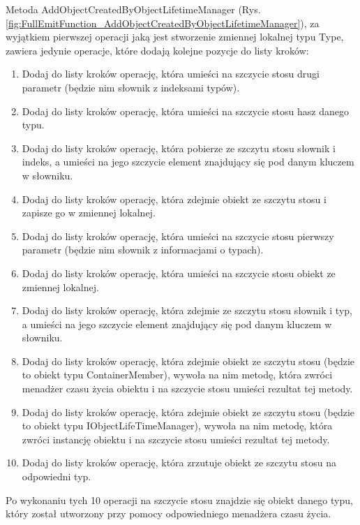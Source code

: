 \documentclass[12pt]{article}
\begin{document}
Metoda AddObjectCreatedByObjectLifetimeManager (Rys. \ref{fig:FullEmitFunction_AddObjectCreatedByObjectLifetimeManager}), za wyjątkiem pierwszej operacji jaką jest stworzenie zmiennej lokalnej typu Type, zawiera jedynie operacje, które dodają kolejne pozycje do listy kroków:
\begin{enumerate}
	\item Dodaj do listy kroków operację, która umieści na szczycie stosu drugi parametr (będzie nim słownik z indeksami typów).
	\item Dodaj do listy kroków operację, która umieści na szczycie stosu hasz danego typu.
	\item Dodaj do listy kroków operację, która pobierze ze szczytu stosu słownik i indeks, a umieści na jego szczycie element znajdujący się pod danym kluczem w słowniku.
	\item Dodaj do listy kroków operację, która zdejmie obiekt ze szczytu stosu i zapisze go w zmiennej lokalnej.
	\item Dodaj do listy kroków operację, która umieści na szczycie stosu pierwszy parametr (będzie nim słownik z informacjami o typach).
	\item Dodaj do listy kroków operację, która umieści na szczycie stosu obiekt ze zmiennej lokalnej.
	\item Dodaj do listy kroków operację, która zdejmie ze szczytu stosu słownik i typ, a umieści na jego szczycie element znajdujący się pod danym kluczem w słowniku.
	\item Dodaj do listy kroków operację, która zdejmie obiekt ze szczytu stosu (będzie to obiekt typu ContainerMember), wywoła na nim metodę, która zwróci menadżer czasu życia obiektu i na szczycie stosu umieści rezultat tej metody.
	\item Dodaj do listy kroków operację, która zdejmie obiekt ze szczytu stosu (będzie to obiekt typu IObjectLifeTimeManager), wywoła na nim metodę, która zwróci instancję obiektu i na szczycie stosu umieści rezultat tej metody.
	\item Dodaj do listy kroków operację, która zrzutuje obiekt ze szczytu stosu na odpowiedni typ.
\end{enumerate}
Po wykonaniu tych 10 operacji na szczycie stosu znajdzie się obiekt danego typu, który został utworzony przy pomocy odpowiedniego menadżera czasu życia.\\ \\
\end{document}
